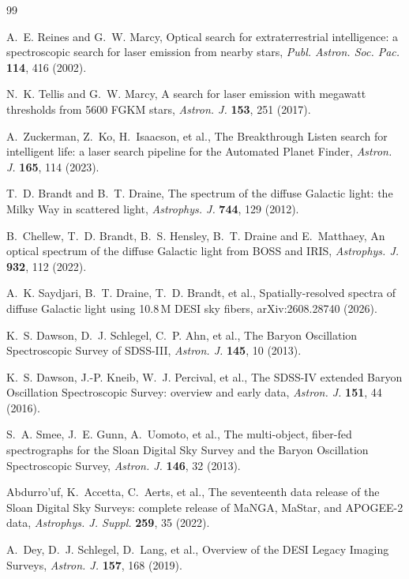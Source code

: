 \documentclass[3p,11pt]{elsarticle}
\begin{document}
\begin{thebibliography}{99}\small\raggedright
\setlength{\itemsep}{1pt}

A.~E. Reines and G.~W. Marcy, Optical search for extraterrestrial intelligence: a
spectroscopic search for laser emission from nearby stars, \emph{Publ. Astron. Soc. Pac.}
\textbf{114}, 416 (2002).

N.~K. Tellis and G.~W. Marcy, A search for laser emission with megawatt thresholds from
5600 FGKM stars, \emph{Astron. J.} \textbf{153}, 251 (2017).

A.~Zuckerman, Z.~Ko, H.~Isaacson, et al., The Breakthrough Listen search for
intelligent life: a laser search pipeline for the Automated Planet Finder,
\emph{Astron. J.} \textbf{165}, 114 (2023).

T.~D. Brandt and B.~T. Draine, The spectrum of the diffuse Galactic light: the Milky
Way in scattered light, \emph{Astrophys. J.} \textbf{744}, 129 (2012).

B.~Chellew, T.~D. Brandt, B.~S. Hensley, B.~T. Draine and E.~Matthaey, An optical
spectrum of the diffuse Galactic light from BOSS and IRIS, \emph{Astrophys. J.}
\textbf{932}, 112 (2022).

A.~K. Saydjari, B.~T. Draine, T.~D. Brandt, et al., Spatially-resolved spectra of
diffuse Galactic light using 10.8\,M DESI sky fibers, arXiv:2608.28740 (2026).

K.~S. Dawson, D.~J. Schlegel, C.~P. Ahn, et al., The Baryon Oscillation Spectroscopic
Survey of SDSS-III, \emph{Astron. J.} \textbf{145}, 10 (2013).

K.~S. Dawson, J.-P. Kneib, W.~J. Percival, et al., The SDSS-IV extended Baryon
Oscillation Spectroscopic Survey: overview and early data, \emph{Astron. J.}
\textbf{151}, 44 (2016).

S.~A. Smee, J.~E. Gunn, A.~Uomoto, et al., The multi-object, fiber-fed spectrographs for
the Sloan Digital Sky Survey and the Baryon Oscillation Spectroscopic Survey,
\emph{Astron. J.} \textbf{146}, 32 (2013).

Abdurro'uf, K.~Accetta, C.~Aerts, et al., The seventeenth data release of the Sloan
Digital Sky Surveys: complete release of MaNGA, MaStar, and APOGEE-2 data,
\emph{Astrophys. J. Suppl.} \textbf{259}, 35 (2022).

A.~Dey, D.~J. Schlegel, D.~Lang, et al., Overview of the DESI Legacy Imaging Surveys,
\emph{Astron. J.} \textbf{157}, 168 (2019).


\end{thebibliography}
\end{document}
